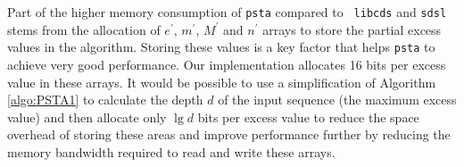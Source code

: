 Part of the higher memory consumption of {\tt psta} compared to {\tt
  libcds} and {\tt sdsl} stems from the allocation of $e^{\prime}$,
$m^{\prime}$, $M^{\prime}$ and $n^{\prime}$ arrays to store the
partial excess values in the algorithm.  Storing these values is a key
factor that helps {\tt psta} to achieve very good performance.  Our
implementation allocates 16 bits per excess value in these arrays.  It
would be possible to use a simplification of Algorithm
\ref{algo:PSTA1} to calculate the depth $d$ of the input sequence (the
maximum excess value) and then allocate only $\lg d$ bits per excess
value to reduce the space overhead of storing these areas and improve
performance further by reducing the memory bandwidth required to read
and write these arrays.
